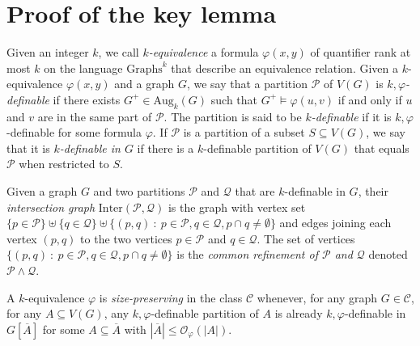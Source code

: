 \documentclass[11pt]{article}
\theoremstyle{definition}
\newcommand{\CC}{{\mathscr C}}
\newcommand{\Oh}{\mathcal{O}}
\renewcommand{\le}{\leqslant}
\let\phi\varphi
\newcommand{\Pp}{\mathcal{P}}
\newcommand{\remph}[1]{{\color{red} \emph{#1}}}
\newcommand{\Aug}{\text{Aug}}
\newcommand{\Graphs}{\mathrm{Graphs}}
\begin{document}
\section{Proof of the key lemma}

Given an integer $k$, we call \remph{$k$-equivalence} a formula $\phi(x, y)$ of quantifier rank at most $k$ on the language $\Graphs^k$ that describe an equivalence relation.
Given a $k$-equivalence $\phi(x, y)$ and a graph $G$, we say that a partition $\mathcal P$ of $V(G)$ is \remph{$k, \phi$-definable} if there exists $G^+ \in \Aug_k(G)$ such that $G^+ \models \phi(u, v)$ if and only if $u$ and $v$ are in the same part of $\mathcal P$.
The partition is said to be \remph{$k$-definable} if it is $k, \phi$-definable for some formula $\phi$.
If $\Pp$ is a partition of a subset $S \subseteq V(G)$, we say that it is \remph{$k$-definable in $G$} if there is a $k$-definable partition of $V(G)$ that equals $\Pp$ when restricted to $S$.

Given a graph $G$ and two partitions $\mathcal P$ and $\mathcal Q$ that are $k$-definable in $G$, their \remph{intersection graph} $\text{Inter}(\mathcal P, \mathcal Q)$ is the graph with vertex set $\{p \in \mathcal P\} \uplus \{q \in \mathcal Q\} \uplus \{(p,q) ~:~ p \in \mathcal P, q \in \mathcal Q, p \cap q \neq \emptyset\}$ and edges joining each vertex $(p, q)$ to the two vertices $p \in \mathcal P$ and $q \in \mathcal Q$.
The set of vertices $\{(p,q) ~:~ p \in \mathcal P, q \in \mathcal Q, p \cap q \neq \emptyset\}$ is the \remph{common refinement of $\mathcal P$ and $\mathcal Q$} denoted $\mathcal P \wedge \mathcal Q$.

A $k$-equivalence $\phi$ is \remph{size-preserving} in the class $\CC$ whenever, for any graph $G \in \CC$, for any $A \subseteq V(G)$, any $k, \phi$-definable partition of $A$ is already $k, \phi$-definable in $G[\overline{A}]$ for some $A \subseteq \overline{A}$ with $|\overline{A}| \le \Oh_{\phi}(|A|)$.
\end{document}
